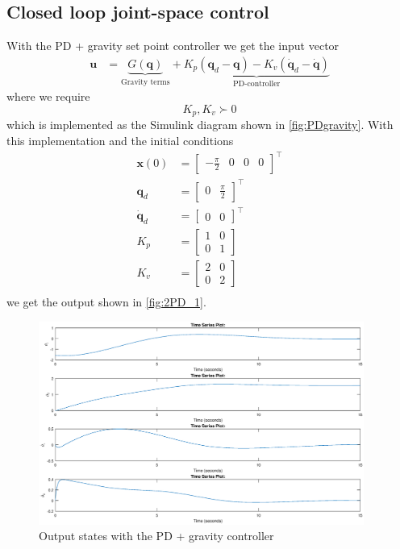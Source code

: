 \documentclass[a4paper]{scrartcl}
\begin{document}
\subsection{Closed loop joint-space control}
With the PD + gravity set point controller we get the input vector
\begin{equation}
	\begin{aligned}
		\bm{u} &= \underbrace{G(\bm{q})}_{\text{Gravity terms}} + \underbrace{K_p(\bm{q}_d - \bm{q}) - K_v (\dot{\bm{q}}_d - \dot{\bm{q}})}_{\text{PD-controller}}
	\end{aligned}
\end{equation}
where we require
\begin{equation}
	K_p, K_v \succ 0
\end{equation}
which is implemented as the Simulink diagram shown in \autoref{fig:PDgravity}. With this implementation and the initial conditions 
\begin{equation}
	\begin{aligned}
		\bm{x}(0) &= \begin{bmatrix} -\tfrac{\pi}{2} & 0 & 0 & 0 \end{bmatrix}^\top \\
		\bm{q}_d &= \begin{bmatrix} 0 & \tfrac{\pi}{2} \end{bmatrix}^\top \\
		\dot{\bm{q}}_d &= \begin{bmatrix} 0 & 0 \end{bmatrix}^\top \\
		K_p &= \begin{bmatrix} 1 & 0 \\ 0 & 1 \end{bmatrix}\\
		K_v &= \begin{bmatrix} 2 & 0 \\ 0 & 2 \end{bmatrix}\\
	\end{aligned}
\end{equation}
we get the output shown in \autoref{fig:2PD_1}.

\begin{figure}[ht]
	\centering
	\includegraphics[width=0.95\textwidth]{fig/2PDg_1.eps}
	\caption{Output states with the PD + gravity controller}
	\label{fig:2PD_1}
\end{figure}
\end{document}
